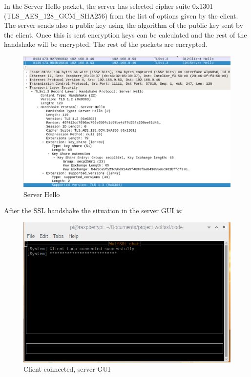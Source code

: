 \documentclass[a4paper,12pt]{report}
\begin{document}
In the Server Hello packet, the server has selected cipher suite 0x1301 (TLS\_AES\_128\_GCM\_SHA256) from the list of options given by the client.
\\The server sends also a public key using the algorithm of the public key sent by the client. Once this is sent encryption keys can be calculated and the rest of the handshake will be encrypted.
The rest of the packets are encrypted. 

\begin{figure}[H]
    \centering
    \includegraphics[scale=0.248]{./code/img/server-hello.png}
    \caption{Server Hello}
    \label{fig:galaxy}
\end{figure}
\pagebreak

After the SSL handshake the situation in the server GUI is:
\begin{figure}[H]
    \centering
    \includegraphics[scale=0.6]{./code/img/2-server.png}
    \caption{Client connected, server GUI}
    \label{fig:galaxy}
\end{figure}
\end{document}
